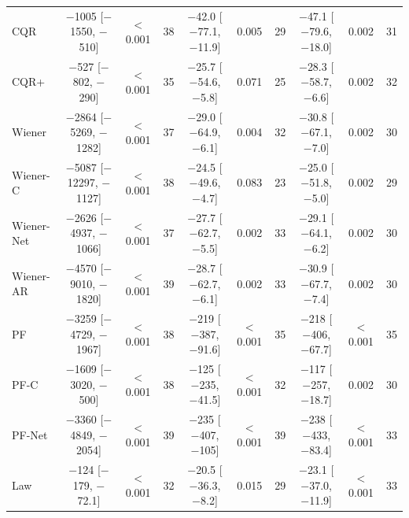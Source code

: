 \begin{table}[!tbp]
\begin{tabular}{lccccccccc}
CQR & $-$1005 [$-$1550, $-$510] & $<$0.001 & 38 & $-$42.0 [$-$77.1, $-$11.9] & 0.005 & 29 & $-$47.1 [$-$79.6, $-$18.0] & 0.002 & 31\\
CQR+ & $-$527 [$-$802, $-$290] & $<$0.001 & 35 & $-$25.7 [$-$54.6, $-$5.8] & 0.071 & 25 & $-$28.3 [$-$58.7, $-$6.6] & 0.002 & 32\\
Wiener & $-$2864 [$-$5269, $-$1282] & $<$0.001 & 37 & $-$29.0 [$-$64.9, $-$6.1] & 0.004 & 32 & $-$30.8 [$-$67.1, $-$7.0] & 0.002 & 30\\
Wiener-C & $-$5087 [$-$12297, $-$1127] & $<$0.001 & 38 & $-$24.5 [$-$49.6, $-$4.7] & 0.083 & 23 & $-$25.0 [$-$51.8, $-$5.0] & 0.002 & 29\\
Wiener-Net & $-$2626 [$-$4937, $-$1066] & $<$0.001 & 37 & $-$27.7 [$-$62.7, $-$5.5] & 0.002 & 33 & $-$29.1 [$-$64.1, $-$6.2] & 0.002 & 30\\
Wiener-AR & $-$4570 [$-$9010, $-$1820] & $<$0.001 & 39 & $-$28.7 [$-$62.7, $-$6.1] & 0.002 & 33 & $-$30.9 [$-$67.7, $-$7.4] & 0.002 & 30\\
PF & $-$3259 [$-$4729, $-$1967] & $<$0.001 & 38 & $-$219 [$-$387, $-$91.6] & $<$0.001 & 35 & $-$218 [$-$406, $-$67.7] & $<$0.001 & 35\\
PF-C & $-$1609 [$-$3020, $-$500] & $<$0.001 & 38 & $-$125 [$-$235, $-$41.5] & $<$0.001 & 32 & $-$117 [$-$257, $-$18.7] & 0.002 & 30\\
PF-Net & $-$3360 [$-$4849, $-$2054] & $<$0.001 & 39 & $-$235 [$-$407, $-$105] & $<$0.001 & 39 & $-$238 [$-$433, $-$83.4] & $<$0.001 & 33\\
Law & $-$124 [$-$179, $-$72.1] & $<$0.001 & 32 & $-$20.5 [$-$36.3, $-$8.2] & 0.015 & 29 & $-$23.1 [$-$37.0, $-$11.9] & $<$0.001 & 33\\
\bottomrule
\end{tabular}
\end{table}
